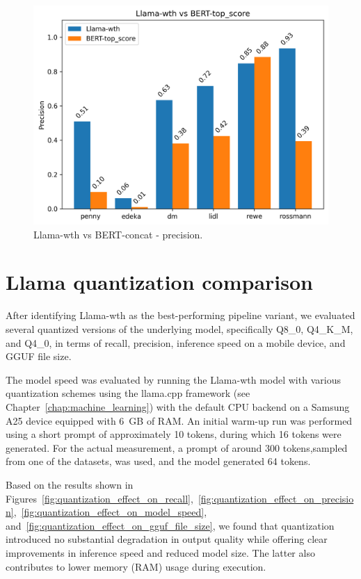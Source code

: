 \documentclass[licencjacka,en]{pracamgr}
\begin{document}
\begin{figure}[htbp]
    \centering
    \includegraphics[width=0.8\linewidth]{bachelor_images/benchmark/llama_vs_bert_precision.png}
    \caption{Llama-wth vs BERT-concat - precision.}
    \label{fig:llama_vs_bert_precision}
\end{figure}

\FloatBarrier

\section{Llama quantization comparison}

After identifying Llama-wth as the best-performing pipeline variant, we evaluated several quantized versions of the underlying model, specifically Q8\_0, Q4\_K\_M, and Q4\_0, in terms of recall, precision, inference speed on a mobile device, and GGUF file size.

The model speed was evaluated by running the Llama-wth model with various quantization schemes using the llama.cpp framework (see Chapter~\ref{chap:machine_learning}) with the default CPU backend on a Samsung A25 device equipped with 6~GB of RAM. An initial warm-up run was performed using a short prompt of approximately 10 tokens, during which 16 tokens were generated. For the actual measurement, a prompt of around 300 tokens,sampled from one of the datasets, was used, and the model generated 64 tokens.

Based on the results shown in Figures~\ref{fig:quantization_effect_on_recall},~\ref{fig:quantization_effect_on_precision},~\ref{fig:quantization_effect_on_model_speed}, and~\ref{fig:quantization_effect_on_gguf_file_size}, we found that quantization introduced no substantial degradation in output quality while offering clear improvements in inference speed and reduced model size. The latter also contributes to lower memory (RAM) usage during execution.
\end{document}

